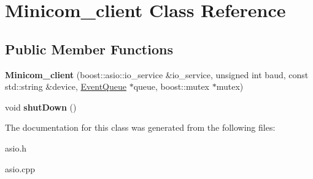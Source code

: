 \hypertarget{classMinicom__client}{\section{Minicom\-\_\-client Class Reference}
\label{classMinicom__client}
}
\subsection*{Public Member Functions}
\begin{DoxyCompactItemize}
\item 
\hypertarget{classMinicom__client_a2e5c7461f088d177fdfbef89e7fd4661}{{\bfseries Minicom\-\_\-client} (boost\-::asio\-::io\-\_\-service \&io\-\_\-service, unsigned int baud, const std\-::string \&device, \hyperlink{classpho_1_1EventQueue}{Event\-Queue} $\ast$queue, boost\-::mutex $\ast$mutex)}\label{classMinicom__client_a2e5c7461f088d177fdfbef89e7fd4661}

\item 
\hypertarget{classMinicom__client_ac37ee7e3baa89f85cf7ea1ea54239ffa}{void {\bfseries shut\-Down} ()}\label{classMinicom__client_ac37ee7e3baa89f85cf7ea1ea54239ffa}

\end{DoxyCompactItemize}


The documentation for this class was generated from the following files\-:\begin{DoxyCompactItemize}
\item 
asio.\-h\item 
asio.\-cpp\end{DoxyCompactItemize}
